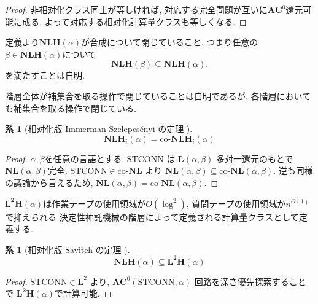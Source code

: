\documentclass[10pt,a4paper,twocolumn]{jarticle}
\theoremstyle{definition}
\newtheorem{corollary}[theorem]{系}
\theoremstyle{remark}
\newcommand{\classfont}{\mathbf}
\newcommand{\co}{\text{co-}}
\newcommand{\AC}{\classfont{AC}}
\renewcommand{\L}{\classfont{L}}
\newcommand{\NL}{\classfont{NL}}
\newcommand{\NLH}{\classfont{NLH}}
\newcommand{\probfont}{\text}
\newcommand{\STCONN}{\probfont{STCONN}}
\begin{document}
\begin{proof}
 非相対化クラス同士が等しければ, 
 対応する完全問題が互いに$\AC^0$還元可能に成る.
 よって対応する相対化計算量クラスも等しくなる.
\end{proof}

定義より$\NLH(\alpha)$が合成について閉じていること, 
つまり任意の$\beta \in \NLH(\alpha)$について
\begin{equation*}
\NLH(\beta) \subseteq \NLH(\alpha).
\end{equation*}
を満たすことは自明.

階層全体が補集合を取る操作で閉じていることは自明であるが,
各階層においても補集合を取る操作で閉じている.
\begin{corollary}
[相対化版 Immerman-Szelepcs{\'e}nyi の定理
{\cite{immerman1988nondeterministic}\cite{szelepcsenyi1988method}}]
\begin{equation*}
 \NLH_i(\alpha) = \co\NLH_i(\alpha) 
\end{equation*}
\end{corollary}

\begin{proof}
 $\alpha, \beta$を任意の言語とする.
 $\STCONN$ は $\L(\alpha, \beta)$ 多対一還元のもとで $\NL(\alpha, \beta)$完全.
 $\STCONN \in \co\NL$ より $\NL(\alpha, \beta) \subseteq \co\NL(\alpha, \beta)$.
 逆も同様の議論から言えるため, $\NL(\alpha, \beta) = \co\NL(\alpha, \beta)$.
\end{proof}


$\classfont{L^2H}(\alpha)$は作業テープの使用領域が$O(\log^2)$,
質問テープの使用領域が$n^{O(1)}$で抑えられる
決定性神託機械の階層によって定義される計算量クラスとして定義する.
\begin{corollary}[相対化版 Savitch の定理
{\cite{savitch1970relationships}}]
\label{corollary:end}
\begin{equation*}
 \NLH(\alpha) \subseteq \classfont{L^2H}(\alpha)
\end{equation*}
\end{corollary}

\begin{proof}
 $\STCONN \in \L^2$ より, 
 $\AC^0(\STCONN, \alpha)$ 回路を深さ優先探索することで
 $\classfont{L^2H}(\alpha)$で計算可能.
\end{proof}





\end{document}
